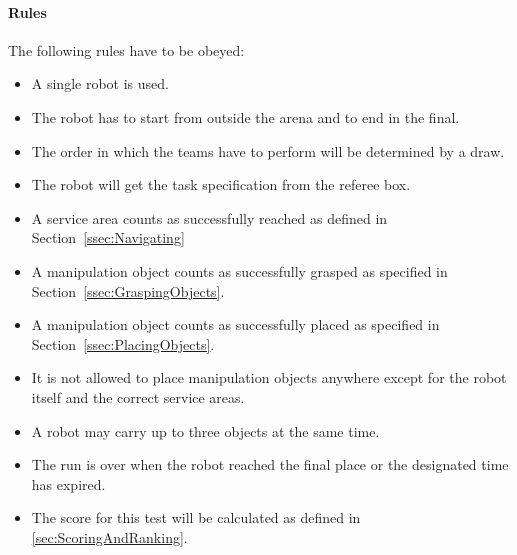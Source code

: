 %

\paragraph{Rules}
The following rules have to be obeyed:

\begin{itemize}
\item A single robot is used.
\item The robot has to start from outside the arena and to end in the final.
\item The order in which the teams have to perform will be determined by a draw.
\item The robot will get the task specification from the referee box.
\item A service area counts as successfully reached as defined in Section~\ref{ssec:Navigating}
\item A manipulation object counts as successfully grasped as specified in Section~\ref{ssec:GraspingObjects}.
\item A manipulation object counts as successfully placed as specified in Section~\ref{ssec:PlacingObjects}.
\item It is not allowed to place manipulation objects anywhere except for the robot itself and the correct service areas.
\item A robot may carry up to three objects at the same time.
\item The run is over when the robot reached the final place or the designated time has expired.
\item The score for this test will be calculated as defined in \ref{sec:ScoringAndRanking}.

\end{itemize}


%
%
%
